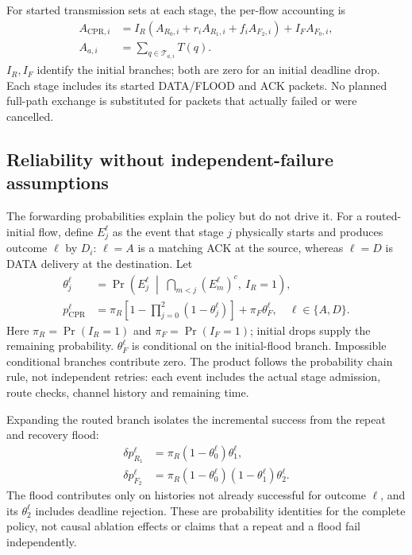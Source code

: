 \documentclass[conference,letterpaper,10pt]{IEEEtran}
\begin{document}
For started transmission sets at each stage, the per-flow accounting is
\begin{equation}
\begin{aligned}
A_{\mathrm{CPR},i}
 &=I_R\!\left(A_{R_0,i}+r_iA_{R_1,i}+f_iA_{F_2,i}\right)
    +I_FA_{F_0,i},\\
A_{a,i}&=\sum_{q\in\mathcal T_{a,i}}T(q).
\end{aligned}
\label{eq:cpr-flow-cost}
\end{equation}
$I_R,I_F$ identify the initial branches; both are zero for an initial
deadline drop. Each stage includes its started DATA/FLOOD and ACK packets.
No planned full-path exchange is substituted for packets that actually
failed or were cancelled.

\subsection{Reliability without independent-failure assumptions}
The forwarding probabilities explain the policy but do not drive it.
For a routed-initial flow, define $E_j^\ell$ as the event that stage $j$
physically starts and produces outcome $\ell$ by $D_i$:
$\ell=A$ is a matching ACK at the source, whereas $\ell=D$ is DATA delivery
at the destination. Let
\begin{equation}
\begin{aligned}
\theta_j^\ell
 &=\Pr\!\left(E_j^\ell\;\middle|\;
       \bigcap_{m<j}(E_m^\ell)^c,\ I_R=1\right),\\
p_{\mathrm{CPR}}^\ell
 &=\pi_R\left[1-\prod_{j=0}^{2}(1-\theta_j^\ell)\right]
       +\pi_F\theta_F^\ell,\quad \ell\in\{A,D\}.
\end{aligned}
\label{eq:cpr-reliability}
\end{equation}
Here $\pi_R=\Pr(I_R=1)$ and $\pi_F=\Pr(I_F=1)$; initial drops supply the
remaining probability. $\theta_F^\ell$ is conditional on the initial-flood
branch. Impossible conditional branches contribute zero.
The product follows the probability chain rule, not independent retries:
each event includes the actual stage admission, route checks, channel
history and remaining time.

Expanding the routed branch isolates the incremental success from the
repeat and recovery flood:
\begin{equation}
\begin{aligned}
\delta p_{R_1}^{\ell}&=\pi_R(1-\theta_0^{\ell})\theta_1^{\ell},\\
\delta p_{F_2}^{\ell}&=\pi_R(1-\theta_0^{\ell})(1-\theta_1^{\ell})
 \theta_2^{\ell}.
\end{aligned}
\label{eq:cpr-marginal-gain}
\end{equation}
The flood contributes only on histories not already successful for outcome
$\ell$, and its $\theta_2^{\ell}$ includes deadline rejection. These are
probability identities for the complete policy, not causal ablation effects
or claims that a repeat and a flood fail independently.
\end{document}
